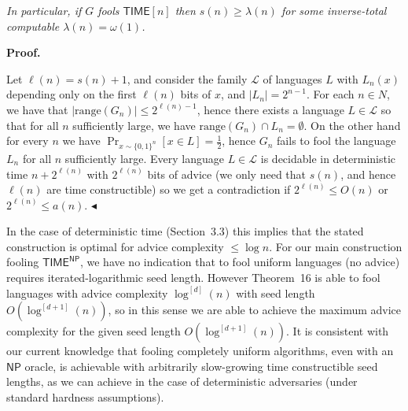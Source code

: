 \documentclass[10pt,a4paper]{article}
\begin{document}
\emph{In particular, if $G$ fools ${\mathsf{TIME}}[n]$ then $s(n)\geq\lambda(n)$ for some inverse-total computable $\lambda(n)=\omega(1)$.}\par






\par\medskip\noindent\textbf{Proof.}\par




Let $\ell(n)=s(n)+1$, and consider the family $\mathcal{L}$ of languages $L$ with $L_{n}(x)$ depending only on the first $\ell(n)$ bits of $x$, and $|L_{n}|=2^{n-1}$.
For each $n\in N$, we have that $|\mathrm{range}(G_{n})|\leq 2^{\ell(n)-1}$, hence there exists a language $L\in\mathcal{L}$ so that for all $n$ sufficiently large, we have $\mathrm{range}(G_{n})\cap L_{n}=\emptyset$. On the other hand for every $n$ we have $\Pr_{x\sim\{0,1\}^{n}}[x\in L]=\frac{1}{2}$, hence $G_{n}$ fails to fool the language $L_{n}$ for all $n$ sufficiently large. Every language $L\in\mathcal{L}$ is decidable in deterministic time $n+2^{\ell(n)}$ with $2^{\ell(n)}$ bits of advice (we only need that $s(n)$, and hence $\ell(n)$ are time constructible) so we get a contradiction if $2^{\ell(n)}\leq O(n)$ or $2^{\ell(n)}\leq a(n)$.
$\blacktriangleleft$\par




In the case of deterministic time (Section 3.3) this implies that the stated construction is optimal for advice complexity $\leq\log n$. For our main construction fooling ${\mathsf{TIME}}^{{\mathsf{NP}}}$, we have no indication that to fool uniform languages (no advice) requires iterated-logarithmic seed length. However Theorem 16 is able to fool languages with advice complexity $\log^{[d]}(n)$ with seed length $O(\log^{[d+1]}(n))$, so in this sense we are able to achieve the maximum advice complexity for the given seed length $O(\log^{[d+1]}(n))$. It is consistent with our current knowledge that fooling completely uniform algorithms, even with an ${\mathsf{NP}}$ oracle, is achievable with arbitrarily slow-growing time constructible seed lengths, as we can achieve in the case of deterministic adversaries (under standard hardness assumptions).\par
\end{document}
